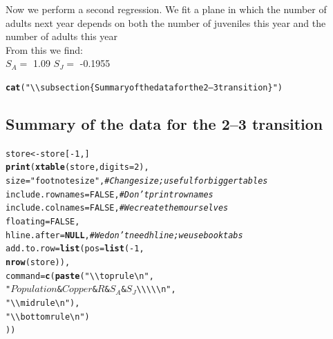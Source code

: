 \documentclass{article}\usepackage[]{graphicx}\usepackage[]{color}
\makeatletter
\newcommand{\hlnum}[1]{\textcolor[rgb]{0.686,0.059,0.569}{#1}}%
\newcommand{\hlstr}[1]{\textcolor[rgb]{0.192,0.494,0.8}{#1}}%
\newcommand{\hlcom}[1]{\textcolor[rgb]{0.678,0.584,0.686}{\textit{#1}}}%
\newcommand{\hlopt}[1]{\textcolor[rgb]{0,0,0}{#1}}%
\newcommand{\hlstd}[1]{\textcolor[rgb]{0.345,0.345,0.345}{#1}}%
\newcommand{\hlkwa}[1]{\textcolor[rgb]{0.161,0.373,0.58}{\textbf{#1}}}%
\newcommand{\hlkwb}[1]{\textcolor[rgb]{0.69,0.353,0.396}{#1}}%
\newcommand{\hlkwc}[1]{\textcolor[rgb]{0.333,0.667,0.333}{#1}}%
\newcommand{\hlkwd}[1]{\textcolor[rgb]{0.737,0.353,0.396}{\textbf{#1}}}%
\newenvironment{kframe}{%
 \def\at@end@of@kframe{}%
 \ifinner\ifhmode%
  \def\at@end@of@kframe{\end{minipage}}%
  \begin{minipage}{\columnwidth}%
 \fi\fi%
 \def\FrameCommand##1{\hskip\@totalleftmargin \hskip-\fboxsep
 \colorbox{shadecolor}{##1}\hskip-\fboxsep
     \hskip-\linewidth \hskip-\@totalleftmargin \hskip\columnwidth}%
 \MakeFramed {\advance\hsize-\width
   \@totalleftmargin\z@ \linewidth\hsize
   \@setminipage}}%
 {\par\unskip\endMakeFramed%
 \at@end@of@kframe}
\makeatother
\begin{document}
Now we perform a second regression. We fit a plane in which the number of adults next year depends on both the number of juveniles this year and the number of adults this year\\From this we find:\\ 
$S_A=$ 1.09 
$S_J=$ -0.1955 
\begin{kframe}\begin{alltt}
\hlkwd{cat}\hlstd{(}\hlstr{"\textbackslash{}\textbackslash{}subsection\{Summary of the data for the 2--3 transition\}"}\hlstd{)}
\end{alltt}
\end{kframe}\subsection{Summary of the data for the 2--3 transition}\begin{kframe}\begin{alltt}
\hlstd{store}\hlkwb{<-}\hlstd{store[}\hlopt{-}\hlnum{1}\hlstd{,]}
\hlkwd{print}\hlstd{(}\hlkwd{xtable}\hlstd{(store,} \hlkwc{digits}\hlstd{=}\hlnum{2}\hlstd{),}
      \hlkwc{size}\hlstd{=}\hlstr{"footnotesize"}\hlstd{,} \hlcom{#Change size; useful for bigger tables}
      \hlkwc{include.rownames}\hlstd{=}\hlnum{FALSE}\hlstd{,} \hlcom{#Don't print rownames}
      \hlkwc{include.colnames}\hlstd{=}\hlnum{FALSE}\hlstd{,} \hlcom{#We create them ourselves}
      \hlkwc{floating}\hlstd{=}\hlnum{FALSE}\hlstd{,}
      \hlkwc{hline.after}\hlstd{=}\hlkwa{NULL}\hlstd{,} \hlcom{#We don't need hline; we use booktabs}
      \hlkwc{add.to.row} \hlstd{=} \hlkwd{list}\hlstd{(}\hlkwc{pos} \hlstd{=} \hlkwd{list}\hlstd{(}\hlopt{-}\hlnum{1}\hlstd{,}
                                   \hlkwd{nrow}\hlstd{(store)),}
                        \hlkwc{command} \hlstd{=} \hlkwd{c}\hlstd{(}\hlkwd{paste}\hlstd{(}\hlstr{"\textbackslash{}\textbackslash{}toprule \textbackslash{}n"}\hlstd{,}
                                          \hlstr{"$Population$ & $Copper$ & $R$ & $S_A$ & $S_J$ \textbackslash{}\textbackslash{}\textbackslash{}\textbackslash{}\textbackslash{}n"}\hlstd{,}
                                          \hlstr{"\textbackslash{}\textbackslash{}midrule \textbackslash{}n"}\hlstd{),}
                                    \hlstr{"\textbackslash{}\textbackslash{}bottomrule \textbackslash{}n"}\hlstd{)}
                        \hlstd{))}
\end{alltt}
\end{kframe}%
\end{document}
